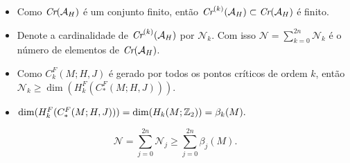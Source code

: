 \documentclass{beamer}
\begin{document}
\begin{footnotesize}
\begin{frame}
			\begin{prova}
				\begin{itemize}
					\item Como $\textit{Cr}(\mathcal{A}_{H})$ é um conjunto finito, então $\textit{Cr}^{(k)}(\mathcal{A}_{H}) \subset \textit{Cr}(\mathcal{A}_{H})$ é finito.
					
					\item Denote a cardinalidade de $\textit{Cr}^{(k)}(\mathcal{A}_{H})$ por $\mathcal{N}_{k}$. Com isso $\mathcal{N} =\sum_{k=0}^{2n} \mathcal{N}_{k}$ é o número de elementos de $\textit{Cr}(\mathcal{A}_{H})$.
					
					\item  Como $C^{F}_{k}(M;H,J)$ é gerado por todos os pontos críticos de ordem $k$, então $\mathcal{N}_{k}\geq \dim(	H^{F}_{k}(C^{F}_{*}(M;H,J)))$. 
					
					\item $\dim(	H^{F}_{k}(C^{F}_{*}(M;H,J)))  = \dim(	H_{k}(M;\mathbb{Z}_{2})) = \beta_{k}(M).$
				\end{itemize} 
				$$
				\mathcal{N} =\sum_{j=0}^{2n} \mathcal{N}_{j} \geq \sum_{j=0}^{2n} \beta_{j}(M).
				$$
				
			\end{prova}
			
	\end{frame}

\end{footnotesize}	
\end{document}
